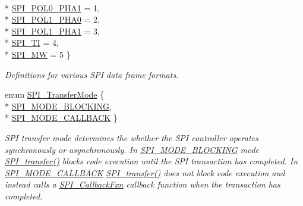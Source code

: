 \begin{DoxyCompactItemize}
\\*
\hyperlink{_s_p_i_8h_a4e1f33555dfa8147205af5b266f3a489a340efc6d0f6f3b5be1151444c15faabf}{S\-P\-I\-\_\-\-P\-O\-L0\-\_\-\-P\-H\-A1} = 1, 
\\*
\hyperlink{_s_p_i_8h_a4e1f33555dfa8147205af5b266f3a489ace88daceb628498715aeda698541c95c}{S\-P\-I\-\_\-\-P\-O\-L1\-\_\-\-P\-H\-A0} = 2, 
\\*
\hyperlink{_s_p_i_8h_a4e1f33555dfa8147205af5b266f3a489a4441729b292511628cb1e9f102da9166}{S\-P\-I\-\_\-\-P\-O\-L1\-\_\-\-P\-H\-A1} = 3, 
\\*
\hyperlink{_s_p_i_8h_a4e1f33555dfa8147205af5b266f3a489ac3cb11b3a833e28368e267161551eb1d}{S\-P\-I\-\_\-\-T\-I} = 4, 
\\*
\hyperlink{_s_p_i_8h_a4e1f33555dfa8147205af5b266f3a489a34dc698e46fc5c1b2b1f0de19a44fdcb}{S\-P\-I\-\_\-\-M\-W} = 5
 \}
\begin{DoxyCompactList}\small\item\em Definitions for various S\-P\-I data frame formats. \end{DoxyCompactList}\item 
enum \hyperlink{_s_p_i_8h_ab9ea76c6529d6076eee5e1c4a5a92c6f}{S\-P\-I\-\_\-\-Transfer\-Mode} \{ \\*
\hyperlink{_s_p_i_8h_ab9ea76c6529d6076eee5e1c4a5a92c6fa0dfb2358e008316426895e7237c398e8}{S\-P\-I\-\_\-\-M\-O\-D\-E\-\_\-\-B\-L\-O\-C\-K\-I\-N\-G}, 
\\*
\hyperlink{_s_p_i_8h_ab9ea76c6529d6076eee5e1c4a5a92c6fa5631e69925c47a62a261c78ebbda39fb}{S\-P\-I\-\_\-\-M\-O\-D\-E\-\_\-\-C\-A\-L\-L\-B\-A\-C\-K}
 \}
\begin{DoxyCompactList}\small\item\em S\-P\-I transfer mode determines the whether the S\-P\-I controller operates synchronously or asynchronously. In \hyperlink{_s_p_i_8h_ab9ea76c6529d6076eee5e1c4a5a92c6fa0dfb2358e008316426895e7237c398e8}{S\-P\-I\-\_\-\-M\-O\-D\-E\-\_\-\-B\-L\-O\-C\-K\-I\-N\-G} mode \hyperlink{_s_p_i_8h_a989e17f96b54fcc3dc2cac5f8ac6bdb2}{S\-P\-I\-\_\-transfer()} blocks code execution until the S\-P\-I transaction has completed. In \hyperlink{_s_p_i_8h_ab9ea76c6529d6076eee5e1c4a5a92c6fa5631e69925c47a62a261c78ebbda39fb}{S\-P\-I\-\_\-\-M\-O\-D\-E\-\_\-\-C\-A\-L\-L\-B\-A\-C\-K} \hyperlink{_s_p_i_8h_a989e17f96b54fcc3dc2cac5f8ac6bdb2}{S\-P\-I\-\_\-transfer()} does not block code execution and instead calls a \hyperlink{_s_p_i_8h_aeb03e7608a14021c3b0acf92c90e2168}{S\-P\-I\-\_\-\-Callback\-Fxn} callback function when the transaction has completed. \end{DoxyCompactList}\end{DoxyCompactItemize}
